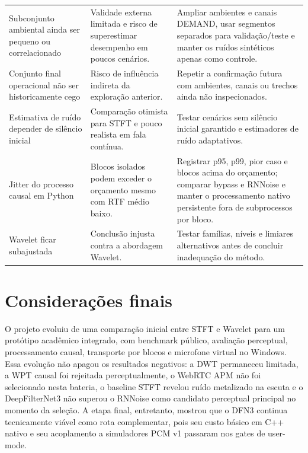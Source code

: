 \begin{table}[!htbp]
\begin{tabularx}{\textwidth}{>{\raggedright\arraybackslash}p{4.0cm}XX}
\addlinespace
Subconjunto ambiental ainda ser pequeno ou correlacionado & Validade externa limitada e risco de superestimar desempenho em poucos cenários. & Ampliar ambientes e canais DEMAND, usar segmentos separados para validação/teste e manter os ruídos sintéticos apenas como controle. \\
\addlinespace
Conjunto final operacional não ser historicamente cego & Risco de influência indireta da exploração anterior. & Repetir a confirmação futura com ambientes, canais ou trechos ainda não inspecionados. \\
\addlinespace
Estimativa de ruído depender de silêncio inicial & Comparação otimista para STFT e pouco realista em fala contínua. & Testar cenários sem silêncio inicial garantido e estimadores de ruído adaptativos. \\
\addlinespace
Jitter do processo causal em Python & Blocos isolados podem exceder o orçamento mesmo com RTF médio baixo. & Registrar p95, p99, pior caso e blocos acima do orçamento; comparar bypass e RNNoise e manter o processamento nativo persistente fora de subprocessos por bloco. \\
\addlinespace
Wavelet ficar subajustada & Conclusão injusta contra a abordagem Wavelet. & Testar famílias, níveis e limiares alternativos antes de concluir inadequação do método. \\
\bottomrule
\end{tabularx}
\end{table}
\FloatBarrier

\section{Considerações finais}

O projeto evoluiu de uma comparação inicial entre STFT e Wavelet para um protótipo acadêmico integrado, com benchmark público, avaliação perceptual, processamento causal, transporte por blocos e microfone virtual no Windows. Essa evolução não apagou os resultados negativos: a DWT permaneceu limitada, a WPT causal foi rejeitada perceptualmente, o WebRTC APM não foi selecionado nesta bateria, o baseline STFT revelou ruído metalizado na escuta e o DeepFilterNet3 não superou o RNNoise como candidato perceptual principal no momento da seleção. A etapa final, entretanto, mostrou que o DFN3 continua tecnicamente viável como rota complementar, pois seu custo básico em C++ nativo e seu acoplamento a simuladores PCM v1 passaram nos gates de user-mode.

